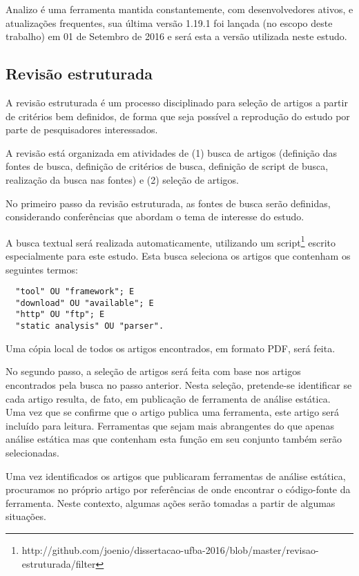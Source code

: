 Analizo é uma ferramenta mantida constantemente, com desenvolvedores ativos, e
atualizações frequentes, sua última versão 1.19.1 foi lançada (no escopo deste
trabalho) em 01 de Setembro de 2016 e será esta a versão utilizada neste
estudo.

\subsection{Revisão estruturada} \label{revisao-estruturada}

A revisão estruturada é um processo disciplinado para seleção de artigos a
partir de critérios bem definidos, de forma que seja possível a reprodução do
estudo por parte de pesquisadores interessados.

A revisão está organizada em atividades de (1) busca de artigos (definição
das fontes de busca, definição de critérios de busca, definição de script de
busca, realização da busca nas fontes) e (2) seleção de artigos. 

No primeiro passo da revisão estruturada, as fontes de busca serão definidas,
considerando conferências que abordam o tema de interesse do estudo. 

A busca textual será realizada automaticamente, utilizando um
script\footnote{http://github.com/joenio/dissertacao-ufba-2016/blob/master/revisao-estruturada/filter}
escrito especialmente para este estudo. Esta busca seleciona os artigos que
contenham os seguintes termos:

\begin{verbatim}
  "tool" OU "framework"; E
  "download" OU "available"; E
  "http" OU "ftp"; E
  "static analysis" OU "parser".
\end{verbatim}

Uma cópia local de todos os artigos encontrados, em formato PDF, será feita.

No segundo passo, a seleção de artigos será feita com base nos artigos
encontrados pela busca no passo anterior.  Nesta seleção, pretende-se
identificar se cada artigo resulta, de fato, em publicação de ferramenta de
análise estática. Uma vez que se confirme que o artigo publica uma
ferramenta, este artigo será incluído para leitura. Ferramentas que sejam
mais abrangentes do que apenas análise estática mas que contenham esta função
em seu conjunto também serão selecionadas.

Uma vez identificados os artigos que publicaram ferramentas de análise
estática, procuramos no próprio artigo por referências de onde encontrar o
código-fonte da ferramenta. Neste contexto, algumas ações serão tomadas a
partir de algumas situações.

